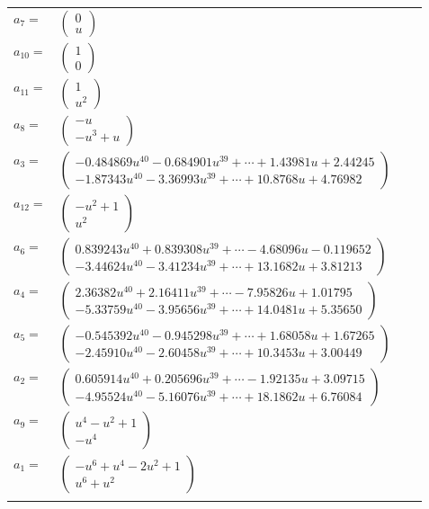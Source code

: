 \documentclass[1p]{elsarticle_modified}
\theoremstyle{definition}
\begin{document}
\begin{tabular}{m{7pt} m{180pt} m{7pt} m{180pt} }
\flushright $a_{7}=$&$\begin{pmatrix}0\\u\end{pmatrix}$ \\
\flushright $a_{10}=$&$\begin{pmatrix}1\\0\end{pmatrix}$ \\
\flushright $a_{11}=$&$\begin{pmatrix}1\\u^2\end{pmatrix}$ \\
\flushright $a_{8}=$&$\begin{pmatrix}- u\\- u^3+u\end{pmatrix}$ \\
\flushright $a_{3}=$&$\begin{pmatrix}-0.484869 u^{40}-0.684901 u^{39}+\cdots+1.43981 u+2.44245\\-1.87343 u^{40}-3.36993 u^{39}+\cdots+10.8768 u+4.76982\end{pmatrix}$ \\
\flushright $a_{12}=$&$\begin{pmatrix}- u^2+1\\u^2\end{pmatrix}$ \\
\flushright $a_{6}=$&$\begin{pmatrix}0.839243 u^{40}+0.839308 u^{39}+\cdots-4.68096 u-0.119652\\-3.44624 u^{40}-3.41234 u^{39}+\cdots+13.1682 u+3.81213\end{pmatrix}$ \\
\flushright $a_{4}=$&$\begin{pmatrix}2.36382 u^{40}+2.16411 u^{39}+\cdots-7.95826 u+1.01795\\-5.33759 u^{40}-3.95656 u^{39}+\cdots+14.0481 u+5.35650\end{pmatrix}$ \\
\flushright $a_{5}=$&$\begin{pmatrix}-0.545392 u^{40}-0.945298 u^{39}+\cdots+1.68058 u+1.67265\\-2.45910 u^{40}-2.60458 u^{39}+\cdots+10.3453 u+3.00449\end{pmatrix}$ \\
\flushright $a_{2}=$&$\begin{pmatrix}0.605914 u^{40}+0.205696 u^{39}+\cdots-1.92135 u+3.09715\\-4.95524 u^{40}-5.16076 u^{39}+\cdots+18.1862 u+6.76084\end{pmatrix}$ \\
\flushright $a_{9}=$&$\begin{pmatrix}u^4- u^2+1\\- u^4\end{pmatrix}$ \\
\flushright $a_{1}=$&$\begin{pmatrix}- u^6+u^4-2 u^2+1\\u^6+u^2\end{pmatrix}$\\&\end{tabular}
\end{document}
